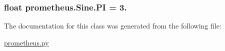 \subsubsection[{P\+I}]{\setlength{\rightskip}{0pt plus 5cm}float prometheus.\+Sine.\+P\+I = 3.\hspace{0.3cm}{\ttfamily [static]}}\label{classprometheus_1_1_sine_a864cd812c3a2a3f45d8374ae067ec454}


The documentation for this class was generated from the following file\+:\begin{DoxyCompactItemize}
\item 
\hyperlink{prometheus_8py}{prometheus.\+py}\end{DoxyCompactItemize}
